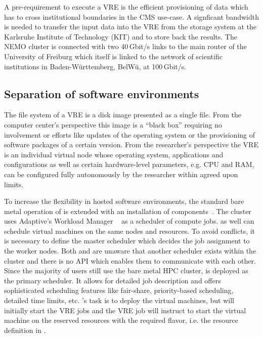 A pre-requirement to execute a VRE is the efficient
provisioning of data which has to cross institutional boundaries in the CMS use-case.
A signficant bandwidth is needed to transfer the input data into the VRE from the storage system at
the Karlsruhe Institute of Technology (KIT) and to store back the results. The
NEMO cluster is connected with two 40\,Gbit/s links to the main router of the
University of Freiburg which itself is linked to the network of
scientific institutions in Baden-W\"urttemberg, BelW\"u, at
100\,Gbit/s.

\subsection{Separation of software environments}

The file system of a VRE is a
disk image presented as a single file. From the computer center's perspective
this image is a ``black box'' requiring no involvement or efforts like
updates of the operating system or the provisioning of software packages of a
certain version. From the researcher's perspective the VRE is an individual
virtual node whose operating system, applications and configurations
as well as certain hardware-level parameters, e.g. CPU and RAM, can be
configured fully autonomously by the researcher within agreed upon limits.


To increase the flexibility in hosted software environments, the standard bare metal
operation of \NEMO is extended with an installation of \Openstack
components~\cite{hpc-symp:2016}.
The \NEMO cluster uses Adaptive's Workload Manager \Moab~\cite{Moab} as a
scheduler of compute jobs.
\Openstack as well can schedule virtual machines on the same nodes and
resources.
To avoid conflicts, it is necessary to define the master scheduler
which decides the job assignment to the worker nodes.
Both \Moab and \Openstack are
unaware that another scheduler exists within the cluster and there is
no API which enables them to  communicate with each other. Since the majority of users still use the
bare metal HPC cluster, \Moab is deployed as the primary scheduler. It allows for
detailed job description and offers sophisticated scheduling features like
fair-share, priority-based scheduling, detailed time limits,
etc. \Openstack 's task is to deploy the virtual machines, but \Moab will initially start the VRE
jobs and the VRE job will instruct \Openstack to start the virtual machine on the
reserved resources with the required flavor, i.e. the resource definition in \Openstack.

